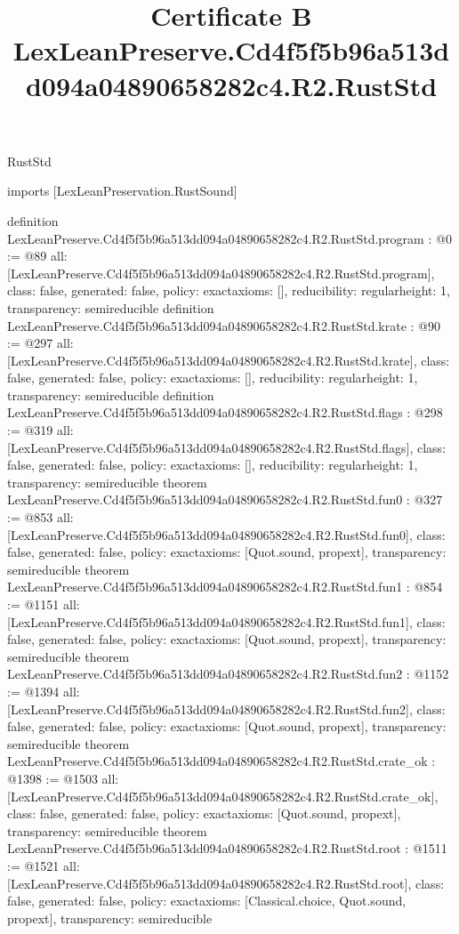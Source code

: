 \begin{lexlean}{RustStd}
\title{Certificate B LexLeanPreserve.Cd4f5f5b96a513dd094a04890658282c4.R2.RustStd}
\begin{coremodule}
imports [LexLeanPreservation.RustSound]

definition LexLeanPreserve.Cd4f5f5b96a513dd094a04890658282c4.R2.RustStd.program : @0 := @89 {
  all: [LexLeanPreserve.Cd4f5f5b96a513dd094a04890658282c4.R2.RustStd.program],
  class: false,
  generated: false,
  policy: exact{axioms: []},
  reducibility: regular{height: 1},
  transparency: semireducible
}
definition LexLeanPreserve.Cd4f5f5b96a513dd094a04890658282c4.R2.RustStd.krate : @90 := @297 {
  all: [LexLeanPreserve.Cd4f5f5b96a513dd094a04890658282c4.R2.RustStd.krate],
  class: false,
  generated: false,
  policy: exact{axioms: []},
  reducibility: regular{height: 1},
  transparency: semireducible
}
definition LexLeanPreserve.Cd4f5f5b96a513dd094a04890658282c4.R2.RustStd.flags : @298 := @319 {
  all: [LexLeanPreserve.Cd4f5f5b96a513dd094a04890658282c4.R2.RustStd.flags],
  class: false,
  generated: false,
  policy: exact{axioms: []},
  reducibility: regular{height: 1},
  transparency: semireducible
}
theorem LexLeanPreserve.Cd4f5f5b96a513dd094a04890658282c4.R2.RustStd.fun0 : @327 := @853 {
  all: [LexLeanPreserve.Cd4f5f5b96a513dd094a04890658282c4.R2.RustStd.fun0],
  class: false,
  generated: false,
  policy: exact{axioms: [Quot.sound, propext]},
  transparency: semireducible
}
theorem LexLeanPreserve.Cd4f5f5b96a513dd094a04890658282c4.R2.RustStd.fun1 : @854 := @1151 {
  all: [LexLeanPreserve.Cd4f5f5b96a513dd094a04890658282c4.R2.RustStd.fun1],
  class: false,
  generated: false,
  policy: exact{axioms: [Quot.sound, propext]},
  transparency: semireducible
}
theorem LexLeanPreserve.Cd4f5f5b96a513dd094a04890658282c4.R2.RustStd.fun2 : @1152 := @1394 {
  all: [LexLeanPreserve.Cd4f5f5b96a513dd094a04890658282c4.R2.RustStd.fun2],
  class: false,
  generated: false,
  policy: exact{axioms: [Quot.sound, propext]},
  transparency: semireducible
}
theorem LexLeanPreserve.Cd4f5f5b96a513dd094a04890658282c4.R2.RustStd.crate_ok : @1398 := @1503 {
  all: [LexLeanPreserve.Cd4f5f5b96a513dd094a04890658282c4.R2.RustStd.crate_ok],
  class: false,
  generated: false,
  policy: exact{axioms: [Quot.sound, propext]},
  transparency: semireducible
}
theorem LexLeanPreserve.Cd4f5f5b96a513dd094a04890658282c4.R2.RustStd.root : @1511 := @1521 {
  all: [LexLeanPreserve.Cd4f5f5b96a513dd094a04890658282c4.R2.RustStd.root],
  class: false,
  generated: false,
  policy: exact{axioms: [Classical.choice, Quot.sound, propext]},
  transparency: semireducible
}


\end{coremodule}
\end{lexlean}
